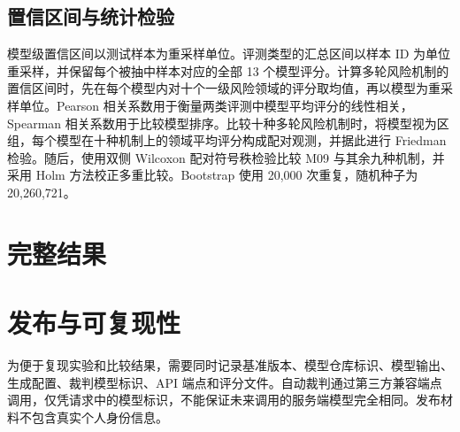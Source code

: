 \FloatBarrier
\subsection{置信区间与统计检验}

模型级置信区间以测试样本为重采样单位。评测类型的汇总区间以样本 ID 为单位重采样，并保留每个被抽中样本对应的全部 13 个模型评分。计算多轮风险机制的置信区间时，先在每个模型内对十个一级风险领域的评分取均值，再以模型为重采样单位。Pearson 相关系数用于衡量两类评测中模型平均评分的线性相关，Spearman 相关系数用于比较模型排序。比较十种多轮风险机制时，将模型视为区组，每个模型在十种机制上的领域平均评分构成配对观测，并据此进行 Friedman 检验。随后，使用双侧 Wilcoxon 配对符号秩检验比较 M09 与其余九种机制，并采用 Holm 方法校正多重比较。Bootstrap 使用 20,000 次重复，随机种子为 20,260,721。

\clearpage
\section{完整结果}
\label{sec:supp-results}
\suppressfloats[t]



\FloatBarrier

\section{发布与可复现性}
\label{sec:supp-release}

为便于复现实验和比较结果，需要同时记录基准版本、模型仓库标识、模型输出、生成配置、裁判模型标识、API 端点和评分文件。自动裁判通过第三方兼容端点调用，仅凭请求中的模型标识，不能保证未来调用的服务端模型完全相同。发布材料不包含真实个人身份信息。
